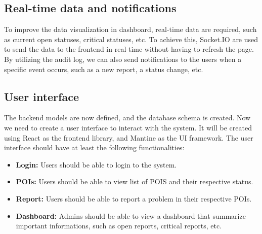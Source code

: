 \subsection{Real-time data and notifications}
\label{subsec:internship_experience:realtime_data_notifications}

To improve the data visualization in dashboard, real-time data are required, such as current open statuses, critical statuses, etc. To achieve this, Socket.IO are used to send the data to the frontend in real-time without having to refresh the page. By utilizing the audit log, we can also send notifications to the users when a specific event occurs, such as a new report, a status change, etc.

\subsection{User interface}

The backend models are now defined, and the database schema is created. Now we need to create a user interface to interact with the system. It will be created using React as the frontend library, and Mantine as the UI framework. The user interface should have at least the following functionalities:

\begin{itemize}
    \item \textbf{Login:} Users should be able to login to the system.
    \item \textbf{POIs:} Users should be able to view list of POIS and their respective status.
    \item \textbf{Report:} Users should be able to report a problem in their respective POIs.
    \item \textbf{Dashboard:} Admins should be able to view a dashboard that summarize important informations, such as open reports, critical reports, etc.
\end{itemize}